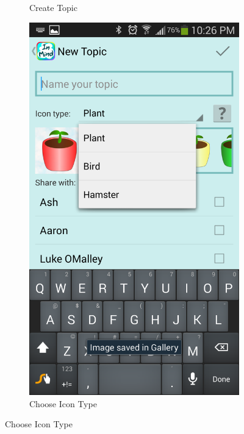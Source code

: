 \begin{figure}
\begin{subfigure}[b]{0.4\textwidth}
         \caption{Create Topic}
      \end{subfigure}
      \begin{subfigure}[b]{0.4\textwidth}
        \includegraphics[width=\textwidth]{topic_create_choose.png}
        \caption{Choose Icon Type}
      \end{subfigure}
      \label{fig:topic_create}
    \end{figure}

